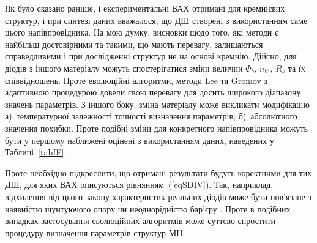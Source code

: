 Як було сказано раніше, і експериментальні ВАХ отримані для кремнієвих структур, і при синтезі даних вважалося, що ДШ створені з використанням саме цього напівпровідника.
На мою думку, висновки щодо того, які методи є найбільш достовірними та такими, що мають перевагу, залишаються справедливими і при дослідженні структур не на основі кремнію.
Дійсно, для діодів з іншого матеріалу можуть спостерігатися зміни  величин $\Phi_b$, $n_\mathrm{id}$, $R_s$ та їх співвідношень.
Проте еволюційні алгоритми, методи Lee та Gromov з адаптивною процедурою довели свою перевагу для досить широкого діапазону значень параметрів.
З іншого боку, зміна матеріалу може викликати модифікацію
а)~температурної залежності точності визначення параметрів;
б)~абсолютного значення похибки.
Проте подібні зміни для конкретного напівпровідника можуть бути у першому наближені оцінені з використанням даних, наведених у Таблиці~\ref{tabIF}.

Проте необхідно підкреслити, що отримані результати будуть коректними для тих ДШ, для яких ВАХ описуються рівнянням~(\ref{eqSDIV}).
Так, наприклад, відхилення від цього закону характеристик реальних діодів може бути пов'язане з наявністю шунтуючого опору чи неоднорідністю бар'єру \cite{Tung:MSE,OlikhJAP}.
Проте в подібних випадках застосування еволюційних алгоритмів може суттєво спростити процедуру визначення параметрів структур МН.


